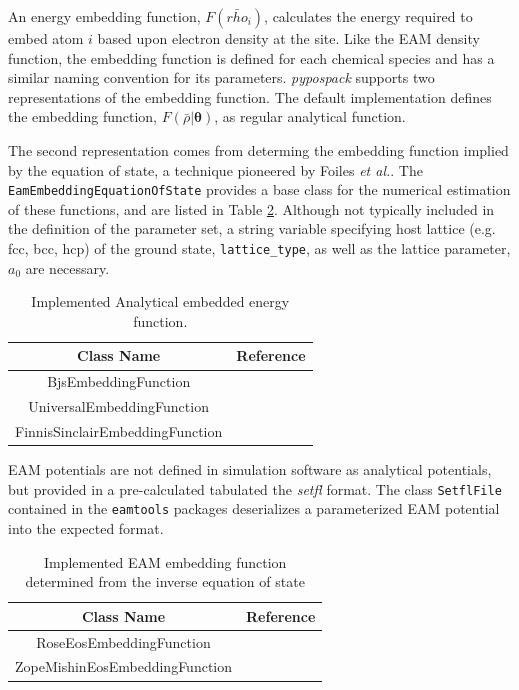 An energy embedding function, $F(\bar{rho}_i)$, calculates the energy required to embed atom $i$ based upon electron density at the site.  Like the EAM density function, the embedding function is defined for each chemical species and has a similar naming convention for its parameters.
\emph{pypospack} supports two representations of the embedding function.
The default implementation defines the embedding function, $F(\bar{\rho}|\bm{\theta})$, as regular analytical function.

The second representation comes from determing the embedding function implied by the equation of state, a technique pioneered by Foiles \emph{et al.}\cite{foiles1986_eam_embedded_eos}.
The \verb|EamEmbeddingEquationOfState| provides a base class for the numerical estimation of these functions, and are listed in Table \ref{tbl:pypospack_eos_embedding_function}.
Although not typically included in the definition of the parameter set, a string variable specifying host lattice (e.g. fcc, bcc, hcp) of the ground state, \verb|lattice_type|, as well as the lattice parameter, $a_0$ are necessary.

\begin{table}[ht]
	\centering
	\caption{Implemented Analytical embedded energy function.}
	\label{tbl:pypospack_embedding_function}
	\begin{tabular}{cc}
		\hline
		{Class Name} & Reference \\
		\hline
		BjsEmbeddingFunction & \\
		UniversalEmbeddingFunction & \\
		FinnisSinclairEmbeddingFunction & \\
		\hline
	\end{tabular}
\end{table}

EAM potentials are not defined in simulation software as analytical potentials, but provided in a pre-calculated tabulated the \emph{setfl} format.  The class \verb|SetflFile| contained in the \verb|eamtools| packages deserializes a parameterized EAM potential into the expected format.

\begin{table}[ht]
	\centering
	\caption{Implemented EAM embedding function determined from the inverse equation of state}
	\label{tbl:pypospack_eos_embedding_function}
	\begin{tabular}{cc}
		\hline
		{Class Name} & {Reference} \\
		\hline
		RoseEosEmbeddingFunction & \cite{foiles1984_eam_eos} \\
		ZopeMishinEosEmbeddingFunction & \cite{zope2003_eam_eos} \\
		\hline
	\end{tabular}
\end{table}


